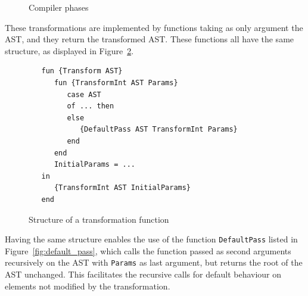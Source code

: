 \documentclass[a4paper]{memoir}
\begin{document}
\begin{figure}[h]
\caption{Compiler phases}
\label{fig:compiler_passes}
\end{figure}


These transformations are implemented by functions
taking as only argument the AST, and they return the transformed AST.
These functions all have the same structure, as displayed in Figure~\ref{fig:pass_structure}.
\begin{figure}[h]
\begin{lstlisting}
   fun {Transform AST}
      fun {TransformInt AST Params}
         case AST
         of ... then
         else
            {DefaultPass AST TransformInt Params}
         end
      end
      InitialParams = ...
   in
      {TransformInt AST InitialParams}
   end
\end{lstlisting}
\caption{Structure of a transformation function}
\label{fig:pass_structure}
\end{figure}
Having the same structure enables the use of the function
\lstinline!DefaultPass! listed in Figure~\ref{fig:default_pass}, which calls the
function passed as second arguments recursively on the AST with
\lstinline!Params! as last argument, but returns the root of the AST unchanged. This
facilitates the recursive calls for default behaviour on elements not modified
by the transformation.
\end{document}
